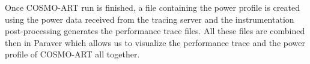 Once COSMO-ART run is finished, a file containing the power profile is
created using the power data  received from the tracing server and the
instrumentation post-processing generates the performance trace files.
All  these files  are  combined then  in  Paraver which  allows us  to
visualize the performance trace and the power profile of COSMO-ART all
together.



